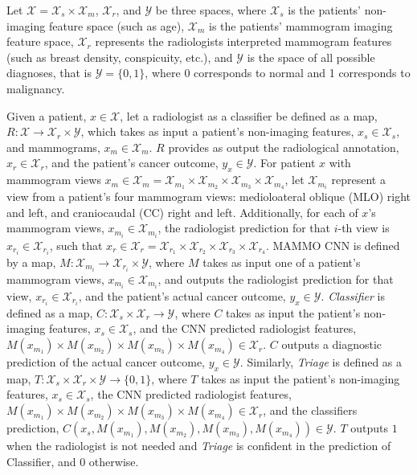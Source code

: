 \documentclass[journal]{IEEEtran}
\begin{document}
Let  $\mathcal{X} = \mathcal{X}_s \times \mathcal{X}_m$, $\mathcal{X}_r$, and $\mathcal{Y}$  be three spaces, where  $\mathcal{X}_s$ is the patients' non-imaging feature space (such as age), $\mathcal{X}_m$ is the patients' mammogram imaging feature space, $\mathcal{X}_r$ represents the radiologists interpreted mammogram features (such as breast density, conspicuity, etc.), and $\mathcal{Y}$ is the space of all possible diagnoses, that is $\mathcal{Y} = \{0,1\}$, where 0 corresponds to normal and 1 corresponds to malignancy.   

Given a patient, $x \in \mathcal{X}$, let a radiologist as a classifier be defined as a map, $R: \mathcal{X} \rightarrow \mathcal{X}_r \times \mathcal{Y}$, which takes as input a patient's non-imaging features, $x_s \in \mathcal{X}_s$, and mammograms, $x_m \in \mathcal{X}_m$. $R$ provides as output the radiological annotation, $x_r \in \mathcal{X}_r$, and the patient's cancer outcome, $y_x \in \mathcal{Y}$.  
For patient $x$ with mammogram views $x_m \in \mathcal{X}_m = \mathcal{X}_{m_1} \times \mathcal{X}_{m_2} \times \mathcal{X}_{m_3} \times \mathcal{X}_{m_4}$, let $\mathcal{X}_{m_i}$ represent a view from a patient's four mammogram views: medioloateral oblique (MLO) right and left, and craniocaudal (CC) right and left.   Additionally, for each of $x$'s mammogram views, $x_{m_i} \in \mathcal{X}_{m_i}$, the radiologist prediction for that $i$-th view is $x_{r_i} \in \mathcal{X}_{r_i}$, such that $x_r \in \mathcal{X}_r =  \mathcal{X}_{r_1} \times \mathcal{X}_{r_2} \times \mathcal{X}_{r_3} \times \mathcal{X}_{r_4}$.
MAMMO CNN is defined by a map, $M: \mathcal{X}_{m_i} \rightarrow \mathcal{X}_{r_i}  \times \mathcal{Y}$, where $M$ takes as input one of a patient's mammogram views, $x_{m_i} \in \mathcal{X}_{m_i}$, and outputs the radiologist prediction for that view, $x_{r_i} \in \mathcal{X}_{r_i}$,  and the patient's actual cancer outcome, $y_x \in \mathcal{Y}$. \textit{Classifier} is defined as a map, $C :  \mathcal{X}_s \times \mathcal{X}_r \rightarrow \mathcal{Y}$, where $C$ takes as input the patient's non-imaging features, $x_s \in \mathcal{X}_s$, and the CNN predicted radiologist features, $M(x_{m_1}) \times M(x_{m_2}) \times M(x_{m_3}) \times M(x_{m_4}) \in \mathcal{X}_r$. $C$ outputs a diagnostic prediction of the actual cancer outcome, $y_x \in \mathcal{Y}$.
Similarly, \textit{Triage} is defined as a map, $T : \mathcal{X}_s \times \mathcal{X}_r \times \mathcal{Y} \to \{0, 1\}$, where $T$ takes as input the patient's non-imaging features, $x_s \in \mathcal{X}_s$, the CNN predicted radiologist features,  $M(x_{m_1}) \times M(x_{m_2}) \times M(x_{m_3}) \times M(x_{m_4}) \in \mathcal{X}_r$, and the classifiers prediction, $C(x_s, M(x_{m_1}), M(x_{m_2}), M(x_{m_3}), M(x_{m_4}) ) \in \mathcal{Y}$. $T$ outputs $1$ when the radiologist is not needed and \textit{Triage} is confident in the prediction of Classifier, and $0$ otherwise.
\end{document}
